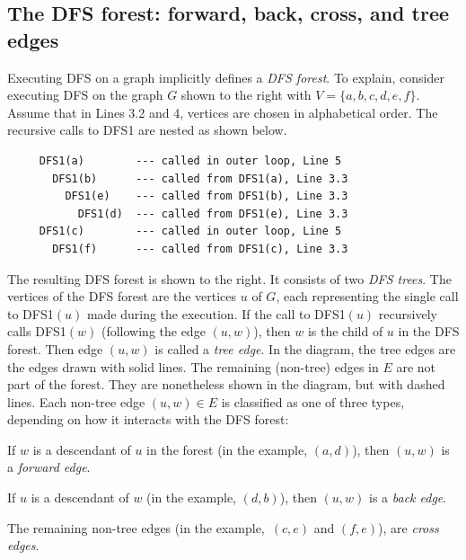 \documentclass[11pt]{article}
\begin{document}
\noindent\parbox{4.85in}{
  \smallskip
  
\subsection{The DFS forest: forward, back, cross, and tree edges}
Executing DFS on a graph implicitly defines a \emph{DFS forest}.
To explain, consider executing \textsf{DFS} on the graph $G$ shown to the right
with $V=\{a,b,c,d,e,f\}$.
Assume that in Lines 3.2 and 4, vertices are chosen in alphabetical order.
The recursive calls to \textsf{DFS1} are nested as shown below.
}
{\footnotesize
\begin{verbatim}
     DFS1(a)        --- called in outer loop, Line 5
       DFS1(b)      --- called from DFS1(a), Line 3.3
         DFS1(e)    --- called from DFS1(b), Line 3.3
           DFS1(d)  --- called from DFS1(e), Line 3.3
     DFS1(c)        --- called in outer loop, Line 5
       DFS1(f)      --- called from DFS1(c), Line 3.3
\end{verbatim}
}
The resulting DFS forest is shown to the right.
It consists of two \emph{DFS trees}.
The vertices of the DFS forest are the vertices $u$ of $G$,
each representing the single call to \textsf{DFS1}$(u)$
made during the execution.
If the call to \textsf{DFS1}$(u)$
recursively calls \textsf{DFS1}$(w)$  (following the edge $(u,w)$),
then $w$ is the child of $u$ in the DFS forest.
Then edge $(u,w)$ is called a \emph{tree edge}.
In the diagram, the tree edges are the edges drawn with solid lines.
The remaining (non-tree) edges in $E$ are not part of the forest.
They are nonetheless shown in the diagram, but with dashed lines.
Each non-tree edge $(u,w)\in E$ is classified as one of three types,
depending on how it interacts with the DFS forest:
\begin{mylist}
\item If $w$ is a descendant of $u$ in the forest (in the example, $(a,d)$),
  then $(u,w)$ is a \emph{forward edge}.
\item If $u$ is a descendant of $w$ (in the example, $(d, b)$),
  then $(u,w)$ is a \emph{back edge}.
\item The remaining non-tree edges (in the example,~$(c,e)$ and $(f,e)$), are \emph{cross edges}.
\end{mylist}
  
\end{document}
